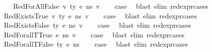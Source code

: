 \begin{isabellebody}
\isamarkupfalse%
\isanewline
\ \ \isamarkupfalse%
\ {\isacharparenleft}{\kern0pt}RedForAllFalse\ v\ ty\ e\ n{\isacharunderscore}{\kern0pt}s\ v{\isacharprime}{\kern0pt}{\isacharparenright}{\kern0pt}\isanewline
\ \ \isamarkupfalse%
\ {\isacharquery}{\kern0pt}case\ \isamarkupfalse%
\ {\isacharparenleft}{\kern0pt}blast\ elim{\isacharcolon}{\kern0pt}\ red{\isacharunderscore}{\kern0pt}expr{\isachardot}{\kern0pt}cases{\isacharparenright}{\kern0pt}\isanewline
{}\isamarkupfalse%
\isanewline
\ \ \isamarkupfalse%
\ {\isacharparenleft}{\kern0pt}RedExistsTrue\ v\ ty\ e\ n{\isacharunderscore}{\kern0pt}s\ v{\isacharprime}{\kern0pt}{\isacharparenright}{\kern0pt}\isanewline
\ \ \isamarkupfalse%
\ {\isacharquery}{\kern0pt}case\ \isamarkupfalse%
\ {\isacharparenleft}{\kern0pt}blast\ elim{\isacharcolon}{\kern0pt}\ red{\isacharunderscore}{\kern0pt}expr{\isachardot}{\kern0pt}cases{\isacharparenright}{\kern0pt}\isanewline
{}\isamarkupfalse%
\isanewline
\ \ \isamarkupfalse%
\ {\isacharparenleft}{\kern0pt}RedExistsFalse\ ty\ e\ n{\isacharunderscore}{\kern0pt}s\ v{\isacharprime}{\kern0pt}{\isacharparenright}{\kern0pt}\isanewline
\ \ \isamarkupfalse%
\ {\isacharquery}{\kern0pt}case\ \isamarkupfalse%
\ {\isacharparenleft}{\kern0pt}blast\ elim{\isacharcolon}{\kern0pt}\ red{\isacharunderscore}{\kern0pt}expr{\isachardot}{\kern0pt}cases{\isacharparenright}{\kern0pt}\isanewline
{}\isamarkupfalse%
\isanewline
\ \ \isamarkupfalse%
\ {\isacharparenleft}{\kern0pt}RedForallT{\isacharunderscore}{\kern0pt}True\ e\ n{\isacharunderscore}{\kern0pt}s\ v{\isacharprime}{\kern0pt}{\isacharparenright}{\kern0pt}\isanewline
\ \ \isamarkupfalse%
\ {\isacharquery}{\kern0pt}case\ \isamarkupfalse%
\ {\isacharparenleft}{\kern0pt}blast\ elim{\isacharcolon}{\kern0pt}\ red{\isacharunderscore}{\kern0pt}expr{\isachardot}{\kern0pt}cases{\isacharparenright}{\kern0pt}\isanewline
{}\isamarkupfalse%
\isanewline
\ \ \isamarkupfalse%
\ {\isacharparenleft}{\kern0pt}RedForallT{\isacharunderscore}{\kern0pt}False\ ty\ e\ n{\isacharunderscore}{\kern0pt}s{\isacharparenright}{\kern0pt}\isanewline
\ \ \isamarkupfalse%
\ {\isacharquery}{\kern0pt}case\ \isamarkupfalse%
\ {\isacharparenleft}{\kern0pt}blast\ elim{\isacharcolon}{\kern0pt}\ red{\isacharunderscore}{\kern0pt}expr{\isachardot}{\kern0pt}cases{\isacharparenright}{\kern0pt}\isanewline

\end{isabellebody}
